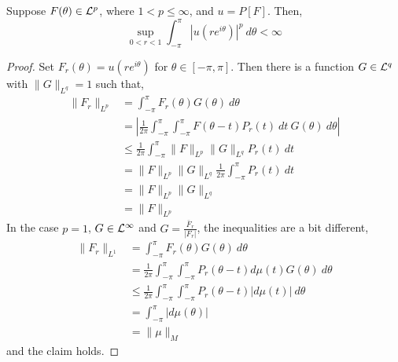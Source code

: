 \begin{theorem}
	Suppose $F(\theta) \in \mathcal{L}^p$, where $1 < p \le \infty$, and $u = P[F]$. Then,
	\[
		\sup_{0 < r < 1} \int_{-\pi}^{\pi} {| u(r e^{i \theta})|}^p\ d \theta < \infty
	\]
	\begin{proof}
		Set $F_r(\theta) = u(r e^{i \theta})$ for $\theta \in [-\pi, \pi]$.
		Then there is a function $G \in \mathcal{L}^q$ with $\lVert G \rVert_{L^q} = 1$ such that,
		\begin{align*}
			\lVert F_r \rVert_{L^p}
			& = \int_{-\pi}^{\pi} F_r(\theta) G(\theta)\ d \theta \\
			& = \left\lvert \frac{1}{2 \pi} \int_{-\pi}^{\pi} \int_{-\pi}^{\pi} F(\theta - t) P_r(t)\ dt\ G(\theta)\ d \theta \right\rvert \\
			& \le \frac{1}{2 \pi} \int_{-\pi}^{\pi} \lVert F \rVert_{L^p} \lVert G \rVert_{L^q} P_r(t)\ dt \\
			& = \lVert F \rVert_{L^p} \lVert G \rVert_{L^q} \frac{1}{2 \pi} \int_{-\pi}^{\pi} P_r(t)\ dt \\
			& = \lVert F \rVert_{L^p} \lVert G \rVert_{L^q} \\
			& = \lVert F \rVert_{L^p}
		\end{align*}
		In the case $p = 1$, $G \in \mathcal{L}^\infty$ and $G = \frac{\bar{F}_r}{|F_r|}$, the inequalities are a bit different,
		\begin{align*}
			\lVert F_r \rVert_{L^1}
			& = \int_{-\pi}^{\pi} F_r(\theta) G(\theta)\ d \theta \\
			& = \frac{1}{2 \pi} \int_{-\pi}^{\pi} \int_{-\pi}^{\pi} P_r(\theta - t) d \mu(t) G(\theta)\ d \theta \\
			& \le \frac{1}{2 \pi} \int_{-\pi}^{\pi} \int_{-\pi}^{\pi} P_r(\theta - t) |d \mu(t)|\ d \theta \\
			& = \int_{-\pi}^{\pi} |d \mu(\theta)| \\
			& = \lVert \mu \rVert_M
		\end{align*}
		and the claim holds.
	\end{proof}
\end{theorem}

